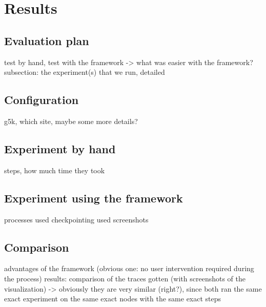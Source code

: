 
\chapter{Results}
\label{Chapter6}

\section{Evaluation plan}
test by hand, test with the framework -> what was easier with the
framework?
subsection: the experiment(s) that we run, detailed
\section{Configuration}
g5k, which site, maybe some more details?
\section{Experiment by hand}
steps, how much time they took
\section{Experiment using the framework}
processes used
checkpointing used
screenshots
\section{Comparison}
advantages of the framework (obvious one: no user intervention
required during the process)
results: comparison of the traces gotten (with screenshots of the
visualization) -> obviously they are very similar (right?), since both
ran the same exact experiment on the same exact nodes with the same
exact steps
